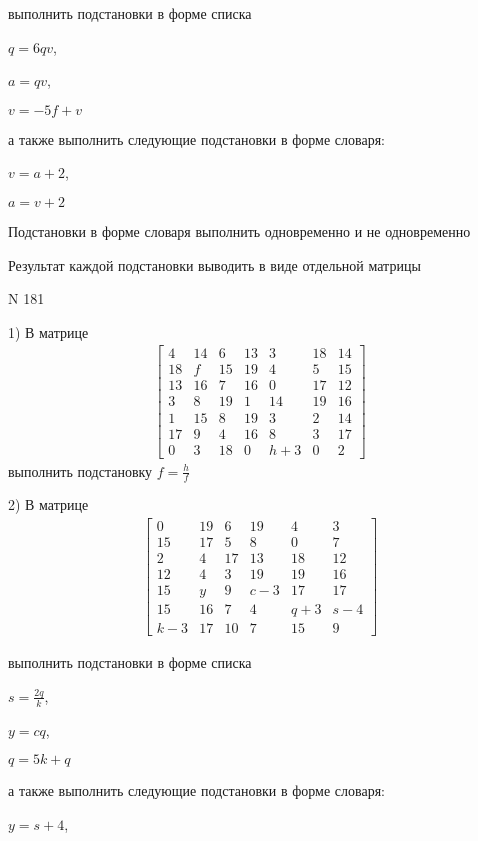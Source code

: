 \documentclass[11pt]{report}
\begin{document}
выполнить подстановки в форме списка

$q=6 q v$,

$a=q v$,

$v=- 5 f + v$

а также выполнить следующие подстановки в форме словаря:

$v=a + 2$,

$a=v + 2$


    Подстановки в форме словаря выполнить одновременно и не одновременно


    Результат каждой подстановки выводить в виде отдельной матрицы

\newpage
N 181


    1) В матрице
\begin{align*}
\left[\begin{matrix}4 & 14 & 6 & 13 & 3 & 18 & 14\\18 & f & 15 & 19 & 4 & 5 & 15\\13 & 16 & 7 & 16 & 0 & 17 & 12\\3 & 8 & 19 & 1 & 14 & 19 & 16\\1 & 15 & 8 & 19 & 3 & 2 & 14\\17 & 9 & 4 & 16 & 8 & 3 & 17\\0 & 3 & 18 & 0 & h + 3 & 0 & 2\end{matrix}\right]
\end{align*}
выполнить подстановку $f=\frac{h}{f}$


    2) В матрице
\begin{align*}
\left[\begin{matrix}0 & 19 & 6 & 19 & 4 & 3\\15 & 17 & 5 & 8 & 0 & 7\\2 & 4 & 17 & 13 & 18 & 12\\12 & 4 & 3 & 19 & 19 & 16\\15 & y & 9 & c - 3 & 17 & 17\\15 & 16 & 7 & 4 & q + 3 & s - 4\\k - 3 & 17 & 10 & 7 & 15 & 9\end{matrix}\right]
\end{align*}

выполнить подстановки в форме списка

$s=\frac{2 q}{k}$,

$y=c q$,

$q=5 k + q$

а также выполнить следующие подстановки в форме словаря:

$y=s + 4$,
\end{document}
